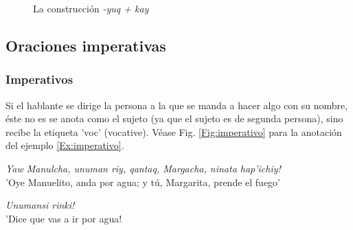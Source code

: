 \documentclass[a4paper,11pt,DIV12]{scrartcl}
\begin{document}
\begin{figure}
 \begin{center}
\end{center}
\caption{La construcci\'on {\em -yuq + kay}}\label{Fig:yuq}
\end{figure}

\subsection{Oraciones imperativas}
\subsubsection{Imperativos}
Si el hablante se dirige la persona a la que se manda a hacer algo con su nombre, \'este no es se anota como el sujeto (ya que el sujeto es de segunda persona), sino recibe la etiqueta 'voc' (vocative). V\'ease Fig. \ref{Fig:imperativo} para la anotaci\'on del ejemplo \ref{Ex:imperativo}.

\begin{examples}
 \item\label{Ex:imperativo} {\em Yaw Manulcha, unuman riy, qantaq, Margacha, ninata hap'ichiy!}\\
	'Oye Manuelito, anda por agua; y t\'u, Margarita, prende el fuego'\\
 	\hfill{\small \citep[83]{Cusi2}}
 \item {\em Unumansi rinki!}\\
      '{\textexclamdown}Dice que vas a ir por agua!
\end{examples}
\end{document}
